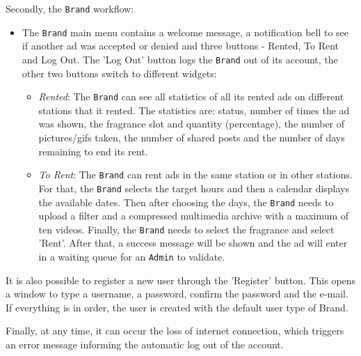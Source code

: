 Secondly, the \texttt{Brand} workflow:
\begin{itemize}
\item The \texttt{Brand} main menu contains a welcome message, a notification bell to see if another ad was accepted or denied and three buttons - Rented, To Rent and Log Out.
The 'Log Out' button logs the \texttt{Brand} out of its account, the other two buttons switch to different widgets:
%
\begin{itemize}
\item \emph{Rented}: The \texttt{Brand} can see all statistics of all its rented ads on different stations that it rented.
The statistics are: status, number of times the ad was shown, the fragrance slot
and quantity (percentage), the number of pictures/\gls{gif}s taken, the number
of shared posts and the number of days remaining to end its rent.
\item \emph{To Rent}: The \texttt{Brand} can rent ads in the same station or in other stations.
For that, the \texttt{Brand} selects the target hours and then a calendar
displays the available dates. Then after choosing the days, the \texttt{Brand}
needs to upload a filter and a compressed multimedia archive with a maximum of ten videos. 
Finally, the \texttt{Brand} needs to select the fragrance and select
'Rent'. After that, a success message will be shown and the ad will enter in a
waiting queue for an \texttt{Admin} to validate.
\end{itemize}
%
\end{itemize}

It is also possible to register a new user through the 'Register' button.
This opens a window to type a username, a password, confirm the password and the e-mail.
If everything is in order, the user is created with the default user type of Brand.

Finally, at any time, it can occur the loss of internet connection, which
triggers an error message informing the automatic log out of the account.
%

